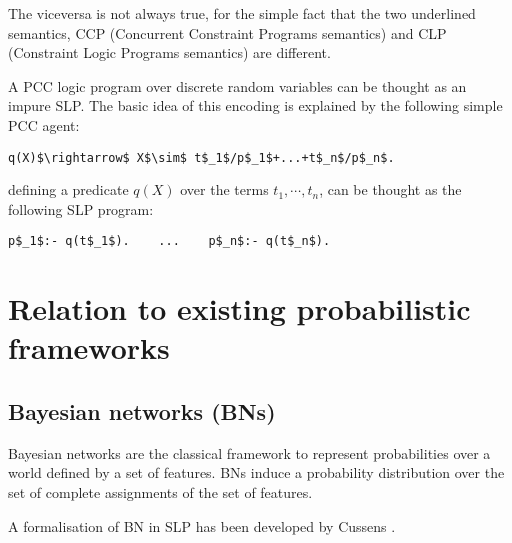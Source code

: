 \documentclass[letterpaper]{article}
\theoremstyle{plain}
\theoremstyle{definition}
\theoremstyle{remark}
\theoremstyle{definition}
\begin{document}
The viceversa is not always true,  for the simple fact that the two underlined semantics, CCP (Concurrent Constraint Programs semantics) and CLP (Constraint Logic Programs semantics) are different.

A PCC logic program over discrete random variables can be thought as an impure SLP.
The basic idea of this encoding is explained by the following simple PCC agent:
\begin{lstlisting}[mathescape=true]
q(X)$\rightarrow$ X$\sim$ t$_1$/p$_1$+...+t$_n$/p$_n$.
 \end{lstlisting}
defining a predicate $q(X)$ over the terms $t_1, \cdots, t_n$, can be thought as the following SLP program:
\begin{lstlisting}[mathescape=true]
p$_1$:- q(t$_1$).    ...    p$_n$:- q(t$_n$). 
 \end{lstlisting}

\section{Relation to existing probabilistic frameworks}

\subsection{Bayesian networks (BNs)}
Bayesian networks 
\cite{d1999inference,dechter1999bucket,B5}
are the classical framework to represent probabilities over a world defined by a set of features. BNs induce a probability distribution over the set of complete assignments of the set of features.

A formalisation of BN in SLP has been developed by Cussens \cite{SLPcussens2001}.
\end{document}
